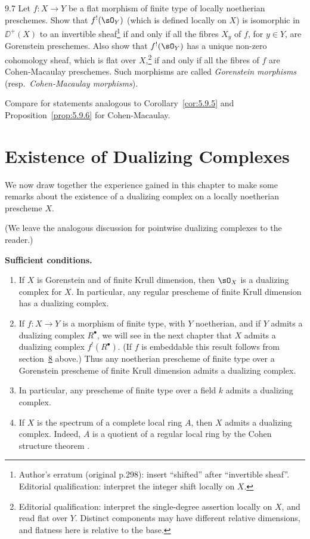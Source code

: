 \begin{bookexercise}{9.7}\label{rem:5.9.7}
Let $f\colon X\to Y$ be a flat morphism of finite type of locally noetherian preschemes. Show that $f^{!}(\sO_Y)$ (which is defined locally on $X$) is isomorphic in $\DD^+(X)$ to an invertible sheaf\footnote{Author's erratum (original p.298): insert ``shifted'' after ``invertible sheaf''. Editorial qualification: interpret the integer shift locally on $X$.} if and only if all the fibres $X_y$ of $f$, for $y\in Y$, are Gorenstein preschemes. Also show that $f^{!}(\sO_Y)$ has a unique non-zero cohomology sheaf, which is flat over $X$,\footnote{Editorial qualification: interpret the single-degree assertion locally on $X$, and read flat over $Y$. Distinct components may have different relative dimensions, and flatness here is relative to the base.} if and only if all the fibres of $f$ are Cohen-Macaulay preschemes. Such morphisms are called \emph{Gorenstein morphisms} (resp.\ \emph{Cohen-Macaulay morphisms}).

Compare \cite[\nopp IV,~6.3 and 6.7]{EGA} for statements analogous to Corollary~\ref{cor:5.9.5} and Proposition~\ref{prop:5.9.6} for Cohen-Macaulay.
\end{bookexercise}

\par\endgroup

\section{Existence of Dualizing Complexes}\label{sec:5.10}

We now draw together the experience gained in this chapter to make some remarks about the existence of a dualizing complex on a locally noetherian prescheme $X$.

(We leave the analogous discussion for pointwise dualizing complexes to the reader.)

\medskip\noindent\textbf{Sufficient conditions.}
\begin{enumerate}
\item If $X$ is Gorenstein and of finite Krull dimension, then $\sO_X$ is a dualizing complex for $X$. In particular, any regular prescheme of finite Krull dimension has a dualizing complex.
\item If $f\colon X\to Y$ is a morphism of finite type, with $Y$ noetherian, and if $Y$ admits a dualizing complex $R^\bullet$, we will see in the next chapter that $X$ admits a dualizing complex $f^{!}(R^\bullet)$. (If $f$ is embeddable this result follows from section~\hyperref[sec:5.8]{8} above.) Thus any noetherian prescheme of finite type over a Gorenstein prescheme of finite Krull dimension admits a dualizing complex.
\item In particular, any prescheme of finite type over a field $k$ admits a dualizing complex.
\item If $X$ is the spectrum of a complete local ring $A$, then $X$ admits a dualizing complex. Indeed, $A$ is a quotient of a regular local ring by the Cohen structure theorem \cite[\nopp (31.1)]{14}.
\end{enumerate}

